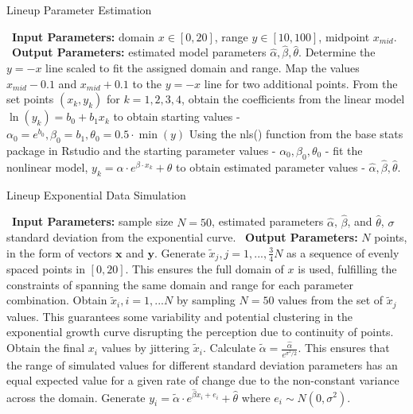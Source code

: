 \documentclass[print]{nuthesis}
\begin{document}
\begin{algorithm}
  \caption{Lineup Parameter Estimation}\label{alg:lineup-parameter-estimation-algorithm}
  \begin{algorithmic}[1]
    \Statex \textbullet~\textbf{Input Parameters:} domain $x\in[0,20]$, range $y\in[10,100]$, midpoint $x_{mid}$.
    \Statex \textbullet~\textbf{Output Parameters:} estimated model parameters $\hat\alpha, \hat\beta, \hat\theta$.
    \State Determine the $y=-x$ line scaled to fit the assigned domain and range.
    \State Map the values $x_{mid} - 0.1$ and $x_{mid} + 0.1$ to the $y=-x$ line for two additional points.
    \State From the set points $(x_k, y_k)$ for $k = 1,2,3,4$, obtain the coefficients from the linear model $\ln(y_k) = b_0 +b_1x_k$ to obtain starting values - $\alpha_0 = e^{b_0}, \beta_0 =  b_1, \theta_0 = 0.5\cdot \min(y)$
    \State Using the nls() function from the base stats package in Rstudio and the starting parameter values - $\alpha_0, \beta_0, \theta_0$ - fit the nonlinear model, $y_k = \alpha\cdot e^{\beta\cdot x_k}+\theta$ to obtain estimated parameter values - $\hat\alpha, \hat\beta, \hat\theta.$
  \end{algorithmic}
\end{algorithm}

\begin{algorithm}
  \caption{Lineup Exponential Data Simulation}\label{alg:lineup-exponential-data-simulation-algorithm}
  \begin{algorithmic}[1]
    \Statex \textbullet~\textbf{Input Parameters:} sample size $N = 50$, estimated parameters $\hat\alpha$, $\hat\beta$, and $\hat\theta$, $\sigma$ standard deviation from the exponential curve.
    \Statex \textbullet~\textbf{Output Parameters:} $N$ points, in the form of vectors $\mathbf{x}$ and $\mathbf{y}$.
    \State Generate $\tilde x_j, j = 1,..., \frac{3}{4}N$ as a sequence of evenly spaced points in $[0,20]$. This ensures the full domain of $x$ is used, fulfilling the constraints of spanning the same domain and range for each parameter combination.
    \State Obtain $\tilde x_i, i = 1,...N$ by sampling $N = 50$ values from the set of $\tilde x_j$ values. This guarantees some variability and potential clustering in the exponential growth curve disrupting the perception due to continuity of points.
    \State Obtain the final $x_i$ values by jittering $\tilde x_i$.
    \State Calculate $\tilde\alpha = \frac{\hat\alpha}{e^{\sigma^2/2}}.$ This ensures that the range of simulated values for different standard deviation parameters has an equal expected value for a given rate of change due to the non-constant variance across the domain.
    \State Generate $y_i = \tilde\alpha\cdot e^{\hat\beta x_i + e_i}+\hat\theta$ where $e_i\sim N(0,\sigma^2).$
  \end{algorithmic}
\end{algorithm}
\end{document}
